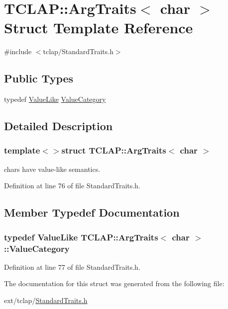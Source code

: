 \hypertarget{struct_t_c_l_a_p_1_1_arg_traits_3_01char_01_4}{}\section{T\+C\+L\+A\+P\+:\+:Arg\+Traits$<$ char $>$ Struct Template Reference}
\label{struct_t_c_l_a_p_1_1_arg_traits_3_01char_01_4}


{\ttfamily \#include $<$tclap/\+Standard\+Traits.\+h$>$}

\subsection*{Public Types}
\begin{DoxyCompactItemize}
\item 
typedef \hyperlink{struct_t_c_l_a_p_1_1_value_like}{Value\+Like} \hyperlink{struct_t_c_l_a_p_1_1_arg_traits_3_01char_01_4_a36f7fe1b3b1649ef8ec08ef7d6fc3160}{Value\+Category}
\end{DoxyCompactItemize}


\subsection{Detailed Description}
\subsubsection*{template$<$$>$struct T\+C\+L\+A\+P\+::\+Arg\+Traits$<$ char $>$}

chars have value-\/like semantics. 

Definition at line 76 of file Standard\+Traits.\+h.



\subsection{Member Typedef Documentation}
\hypertarget{struct_t_c_l_a_p_1_1_arg_traits_3_01char_01_4_a36f7fe1b3b1649ef8ec08ef7d6fc3160}{}
\subsubsection[{Value\+Category}]{\setlength{\rightskip}{0pt plus 5cm}typedef {\bf Value\+Like} {\bf T\+C\+L\+A\+P\+::\+Arg\+Traits}$<$ char $>$\+::{\bf Value\+Category}}\label{struct_t_c_l_a_p_1_1_arg_traits_3_01char_01_4_a36f7fe1b3b1649ef8ec08ef7d6fc3160}


Definition at line 77 of file Standard\+Traits.\+h.



The documentation for this struct was generated from the following file\+:\begin{DoxyCompactItemize}
\item 
ext/tclap/\hyperlink{_standard_traits_8h}{Standard\+Traits.\+h}\end{DoxyCompactItemize}
